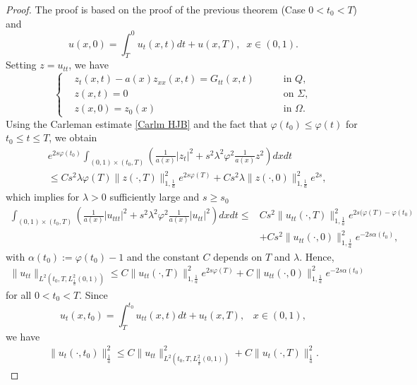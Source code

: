 \documentclass[reqno]{amsart}
\theoremstyle{plain}
\theoremstyle{remark}
\numberwithin{equation}{section}
\begin{document}
\begin{proof}
The proof is based on the proof of the previous theorem (Case $0<t_{0}<T$) and 
$$u(x,0)=\int_{T}^0u_{t}(x,t)dt +u(x,T), \;\; x \in (0,1). $$
    Setting $z=u_{tt}$, we have
\begin{equation}
    \left\{
\begin{aligned}
& z_{t}(x,t) - a(x) z_{xx}(x,t)= G_{tt}(x,t) &&\quad\text{ in } Q,\\
& z(x,t)=0 &&\quad \text{ on } \Sigma,\\
& z(x,0)=z_0(x)  &&\quad \text{ in } \Omega.
\label{eq1to2}
\end{aligned}
\right.
\end{equation}
Using the Carleman estimate \eqref{Carlm HJB} and the fact that $\varphi(t_{0})\leq \varphi(t)$ for $t_{0}\leq t\leq T$, we obtain 
    \begin{align*}
        &e^{2s\varphi(t_{0})}\int_{(0,1)\times (t_{0},T)} \left(\frac{1}{a(x)}\vert z_{t}\vert ^2 +s^2\lambda^2 \varphi^2 \frac{1}{a(x)}z^2\right)dx dt \\&\leqslant Cs^2\lambda \varphi(T)\| z(\cdot,T)\|_{1,\frac{1}{a}}^2 e^{2s\varphi(T)}+Cs^2 \lambda \| z(\cdot,0)\|_{1,\frac{1}{a}}^2 e^{2s},
    \end{align*}
which implies for $ \lambda >0$ sufficiently large and $s\geqslant s_{0}$
\begin{align*}
     \int_{(0,1)\times (t_{0},T)} \left(\frac{1}{a(x)}\vert u_{ttt}\vert ^2 +s^2\lambda^2 \varphi^2 \frac{1}{a(x)}\vert u_{tt} \vert^2\right)dx dt \leqslant & Cs^2\| u_{tt}(\cdot,T)\|_{1,\frac{1}{a}}^2 e^{2s(\varphi(T)-\varphi(t_{0})}\\ &+Cs^2 \| u_{tt}(\cdot,0)\|_{1,\frac{1}{a}}^2 e^{-2s\alpha(t_{0})},
    \end{align*}
    with $\alpha(t_{0}):=\varphi(t_{0})-1$ and the constant $C$ depends on $T$ and $\lambda$. Hence, 
    \begin{align}\label{19}
        \| u_{tt}\|_{L^2(t_{0},T,L^2_{\frac{1}{a}}(0,1))}\leqslant C \| u_{tt}(\cdot,T)\|_{1,\frac{1}{a}}^2e^{2s\varphi(T)}+C \| u_{tt}(\cdot,0)\|_{1,\frac{1}{a}}^2 e^{-2s\alpha(t_{0})}
    \end{align}
    for all $0<t_{0}<T.$ Since
    $$ u_{t}(x,t_{0})=\int_{T}^{t_{0}}u_{tt}(x,t)dt+u_{t}(x,T), \;\;\; x \in (0,1),$$
    we have 
    \begin{align*}
        \| u_{t}(\cdot,t_{0})\|_{\frac{1}{a}}^2\leqslant C \| u_{tt}\|_{L^2(t_{0},T,L^2_{\frac{1}{a}}(0,1))}^2+C\| u_{t}(\cdot,T)\|_{\frac{1}{a}}^2.

\end{align*}
\end{proof}
\end{document}

